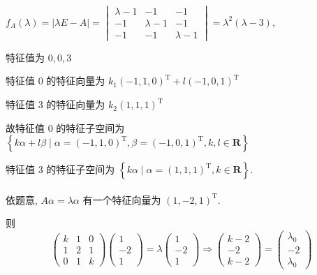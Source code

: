 	 \paragraph{} %
		 \( f_{A}(\lambda) = |\lambda E - A| = \begin{vmatrix}
			 \lambda - 1 & -1          & -1          \\
			 -1          & \lambda - 1 & -1          \\
			 -1          & -1          & \lambda - 1
		 \end{vmatrix} = \lambda^{2}(\lambda - 3) \),

		 特征值为 \( 0, 0, 3 \)

		 特征值 \( 0 \) 的特征向量为 \( k_{1}(-1, 1, 0)^{\mathrm{T}} + l(-1, 0, 1)^{\mathrm{T}} \)

		 特征值 \( 3 \) 的特征向量为 \( k_{2}(1, 1, 1)^{\mathrm{T}} \)

		 故特征值 \( 0 \) 的特征子空间为 \( \left\{ k\alpha + l\beta \mid \alpha = (-1, 1, 0)^{\mathrm{T}}, \beta = (-1, 0, 1)^{\mathrm{T}}, k, l \in \mathbf{R} \right\} \)

		 特征值 \( 3 \) 的特征子空间为 \( \left\{ k\alpha \mid \alpha = (1, 1, 1)^{\mathrm{T}}, k \in \mathbf{R} \right\} \).

	 \paragraph{} %
		 依题意, \( A\alpha = \lambda\alpha \) 有一个特征向量为 \( (1, -2, 1)^{\mathrm{T}} \).

		 则 \[ \begin{pmatrix}
				 k & 1 & 0 \\
				 1 & 2 & 1 \\
				 0 & 1 & k
			 \end{pmatrix}\begin{pmatrix}
				 1  \\
				 -2 \\
				 1
			 \end{pmatrix} = \lambda\begin{pmatrix}
				 1  \\
				 -2 \\
				 1
			 \end{pmatrix} \Rightarrow \begin{pmatrix}
				 k - 2 \\
				 -2    \\
				 k - 2
			 \end{pmatrix} = \begin{pmatrix}
				 \lambda_0 \\
				 -2        \\
				 \lambda_0
			 \end{pmatrix} \]

